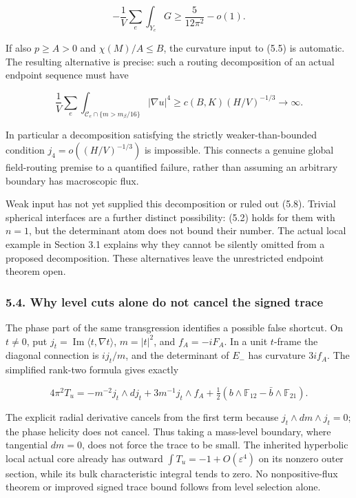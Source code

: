 \documentclass[
  11pt,
]{article}
\begin{document}
\[
 -\frac1V\sum_e\int_{Y_e}G
                         \ge\frac5{12\pi^2}-o(1).
 \tag{5.7}
\]

If also \(p\ge A>0\) and \(\chi(M)/A\le B\), the curvature input to
(5.5) is automatic. The resulting alternative is precise: such a routing
decomposition of an actual endpoint sequence must have

\[
 \frac1V\sum_e\int_{\mathcal C_e\cap\{m>m_\beta/16\}}|\nabla u|^4
                 \ge c(B,K)(H/V)^{-1/3}\longrightarrow\infty.
 \tag{5.8}
\]

In particular a decomposition satisfying the strictly
weaker-than-bounded condition \(j_4=o((H/V)^{-1/3})\) is impossible.
This connects a genuine global field-routing premise to a quantified
failure, rather than assuming an arbitrary boundary has macroscopic
flux.

Weak input has not yet supplied this decomposition or ruled out (5.8).
Trivial spherical interfaces are a further distinct possibility: (5.2)
holds for them with \(n=1\), but the determinant atom does not bound
their number. The actual local example in Section 3.1 explains why they
cannot be silently omitted from a proposed decomposition. These
alternatives leave the unrestricted endpoint theorem open.

\hypertarget{why-level-cuts-alone-do-not-cancel-the-signed-trace}{%
\subsubsection{5.4. Why level cuts alone do not cancel the signed
trace}\label{why-level-cuts-alone-do-not-cancel-the-signed-trace}}

The phase part of the same transgression identifies a possible false
shortcut. On \(t\ne0\), put
\(j_t=\operatorname{Im}\langle t,\nabla t\rangle\), \(m=|t|^2\), and
\(f_A=-iF_A\). In a unit \(t\)-frame the diagonal connection is
\(i j_t/m\), and the determinant of \(E_-\) has curvature \(3i f_A\).
The simplified rank-two formula gives exactly

\[
 4\pi^2T_u=-m^{-2}j_t\wedge dj_t+3m^{-1}j_t\wedge f_A
          +\tfrac12(b\wedge\mathbb F_{12}-\bar b\wedge\mathbb F_{21}).
 \tag{5.9}
\]

The explicit radial derivative cancels from the first term because
\(j_t\wedge dm\wedge j_t=0\); the phase helicity does not cancel. Thus
taking a mass-level boundary, where tangential \(dm=0\), does not force
the trace to be small. The inherited hyperbolic local actual core
already has outward \(\int T_u=-1+O(\varepsilon^4)\) on its nonzero
outer section, while its bulk characteristic integral tends to zero. No
nonpositive-flux theorem or improved signed trace bound follows from
level selection alone.
\end{document}
